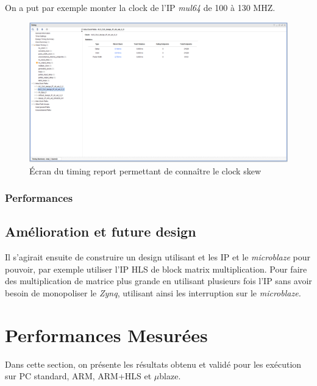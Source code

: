 \documentclass[12pt,a4paper]{article}
\begin{document}
On a put par exemple monter la clock de l'IP \textit{mul64} de 100 à 130 MHZ.

\begin{figure}[H]
	\centering
	\includegraphics[width=\linewidth,trim= 0 300 500 0,clip]{im/timing.png}	
	\caption{Écran du timing report permettant de connaître le clock skew}
	\label{fig-clk}
\end{figure}

\subsubsection{Performances}
\subsection{Amélioration et future design}
Il s'agirait ensuite de construire un design utilisant et les IP et le \textit{microblaze} pour pouvoir, par exemple utiliser l'IP HLS de block matrix multiplication. Pour faire des multiplication de matrice plus grande en utilisant plusieurs fois l'IP sans avoir besoin de monopoliser le \textit{Zynq}, utilisant ainsi les interruption sur le \textit{microblaze.}



\section{Performances Mesurées}
Dans cette section, on présente les résultats obtenu et validé pour les exécution sur PC standard, ARM, ARM+HLS et $\mu$blaze.
\end{document}
